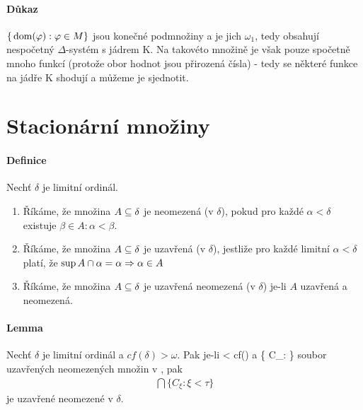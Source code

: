 \documentclass[a4paper,12pt,titlepage]{article}
\begin{document}
\begin{enumerate}
\paragraph{Důkaz}
$\{\operatorname*{\,dom}(\varphi) : \varphi \in M\}$ jsou konečné podmnožiny a je jich
$\omega_1$, tedy obsahují nespočetný $\Delta$-systém s jádrem K. Na takovéto
množině je však pouze spočetně mnoho funkcí (protože obor hodnot jsou přirozená
čísla) - tedy se některé funkce na jádře K shodují a můžeme je sjednotit.


\section{Stacionární množiny}
\setcounter{equation}{0}
\paragraph{Definice}
Nechť $\delta$ je limitní ordinál.
\begin{enumerate}
	\item Říkáme, že množina $A \subseteq \delta$ je neomezená (v $\delta$), pokud
	pro každé $\alpha < \delta$ existuje $\beta \in A: \alpha < \beta$.
	\item Říkáme, že množina $A \subseteq \delta$ je uzavřená (v $\delta$),
	jestliže pro každé limitní $\alpha < \delta$ platí, že $\sup A \cap \alpha =
	\alpha \Rightarrow \alpha \in A$
	\item Říkáme, že množina $A \subseteq \delta$ je uzavřená neomezená (v
	$\delta$) je-li $A$ uzavřená a neomezená.
\end{enumerate}


\paragraph{Lemma}
Nechť $\delta$  je limitní ordinál a $cf(\delta) > \omega$. Pak je-li \tau <
cf(\delta) a \{ C_\xi: \xi \in \tau \} soubor uzavřených neomezených množin v
\delta, pak 
\begin{align}
	\bigcap \{C_\xi: \xi < \tau \}
\end{align}
je uzavřené neomezené v $\delta$.

\end{enumerate}
\end{document}
